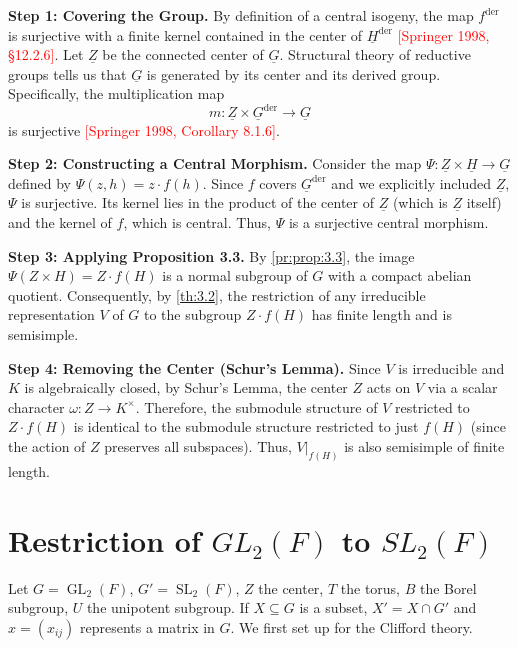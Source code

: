 \documentclass{article}
\newcommand{\GL}{{\operatorname{GL}}}
\newcommand{\SL}{{\operatorname{SL}}}
\newcommand{\sse}{\subseteq}
\begin{document}
\begin{Proof}
    \textbf{Step 1: Covering the Group.}
    By definition of a central isogeny, the map \(f^{\mathrm{der}}\) is surjective with a finite kernel contained in the center of \(\underline{H}^{\mathrm{der}}\) \textcolor{red}{[Springer 1998, §12.2.6]}.
    Let \(\underline{Z}\) be the connected center of \(\underline{G}\). Structural theory of reductive groups tells us that \(\underline{G}\) is generated by its center and its derived group. Specifically, the multiplication map
    \[ m: \underline{Z} \times \underline{G}^{\mathrm{der}} \to \underline{G} \]
    is surjective \textcolor{red}{[Springer 1998, Corollary 8.1.6]}.

    \textbf{Step 2: Constructing a Central Morphism.}
    Consider the map \(\Psi: \underline{Z} \times \underline{H} \to \underline{G}\) defined by \(\Psi(z, h) = z \cdot f(h)\).
    Since \(f\) covers \(\underline{G}^{\mathrm{der}}\) and we explicitly included \(\underline{Z}\), \(\Psi\) is surjective.
    Its kernel lies in the product of the center of \(\underline{Z}\) (which is \(\underline{Z}\) itself) and the kernel of \(f\), which is central. Thus, \(\Psi\) is a surjective central morphism.

    \textbf{Step 3: Applying Proposition 3.3.}
    By \cref{pr:prop:3.3}, the image \(\Psi(Z \times H) = Z \cdot f(H)\) is a normal subgroup of \(G\) with a compact abelian quotient.
    Consequently, by \cref{th:3.2}, the restriction of any irreducible representation \(V\) of \(G\) to the subgroup \(Z \cdot f(H)\) has finite length and is semisimple.

    \textbf{Step 4: Removing the Center (Schur's Lemma).}
    Since \(V\) is irreducible and \(K\) is algebraically closed, by Schur's Lemma, the center \(Z\) acts on \(V\) via a scalar character \(\omega: Z \to K^\times\).
    Therefore, the submodule structure of \(V\) restricted to \(Z \cdot f(H)\) is identical to the submodule structure restricted to just \(f(H)\) (since the action of \(Z\) preserves all subspaces).
    Thus, \(V|_{f(H)}\) is also semisimple of finite length.
\end{Proof}

\section{Restriction of $GL_2(F)$ to $SL_2(F)$}


Let $G = \GL_2(F)$, $G' =\SL_2(F)$, $Z$ the center, $T$ the torus, $B$ the Borel subgroup, $U$ the unipotent
subgroup. If $X \sse G$ is a subset, $X' = X\cap G'$ and $x = (x_{ij})$ represents a matrix in $G$. We first
set up for the Clifford theory.
\end{document}
